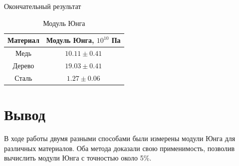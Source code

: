 \documentclass[a4paper,12 pt]{article}
\begin{document}
\begin{enumerate}
    Окончательный результат
    \begin{table}[H]
        \centering
        \begin{tabular}{|c|c|}
            \hline
             Материал & Модуль Юнга, $10^{10}$ Па \\
             \hline
             Медь & $10.11 \pm 0.41$\\
             \hline
             Дерево & $19.03 \pm 0.41$\\
             \hline
             Сталь & $1.27 \pm 0.06$\\
             \hline
        \end{tabular}
        \caption{Модуль Юнга}
    \end{table}
\end{enumerate}
\section{Вывод}
В ходе работы двумя разными способами были измерены модули Юнга для различных материалов. Оба метода доказали свою применимость, позволив вычислить модули Юнга с точностью около 5\%. 
\end{document}
